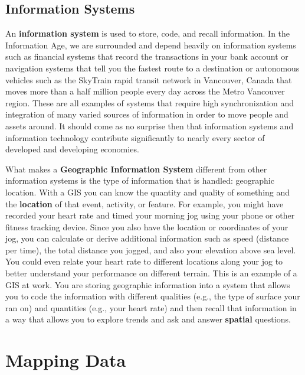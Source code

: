 \documentclass[
]{book}
\begin{document}
\hypertarget{information-systems}{%
\section{Information Systems}\label{information-systems}}

An \textbf{information system} is used to store, code, and recall information. In the Information Age, we are surrounded and depend heavily on information systems such as financial systems that record the transactions in your bank account or navigation systems that tell you the fastest route to a destination or autonomous vehicles such as the SkyTrain rapid transit network in Vancouver, Canada that moves more than a half million people every day across the Metro Vancouver region. These are all examples of systems that require high synchronization and integration of many varied sources of information in order to move people and assets around. It should come as no surprise then that information systems and information technology contribute significantly to nearly every sector of developed and developing economies.

What makes a \textbf{Geographic Information System} different from other information systems is the type of information that is handled: geographic location. With a GIS you can know the quantity and quality of something and the \textbf{location} of that event, activity, or feature. For example, you might have recorded your heart rate and timed your morning jog using your phone or other fitness tracking device. Since you also have the location or coordinates of your jog, you can calculate or derive additional information such as speed (distance per time), the total distance you jogged, and also your elevation above sea level. You could even relate your heart rate to different locations along your jog to better understand your performance on different terrain. This is an example of a GIS at work. You are storing geographic information into a system that allows you to code the information with different qualities (e.g., the type of surface your ran on) and quantities (e.g., your heart rate) and then recall that information in a way that allows you to explore trends and ask and answer \textbf{spatial} questions.

\hypertarget{mapping-data}{%
\chapter{Mapping Data}\label{mapping-data}}
\end{document}
